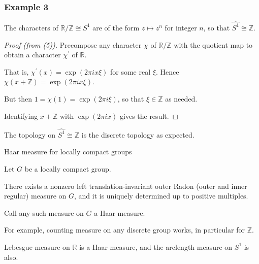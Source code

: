 \documentclass[mathserif
, handout
]{beamer}
\begin{document}
\begin{frame}
    \frametitle{Example 3}
The characters of $\mathbb{R}/\mathbb{Z}\cong S^1$ are of the form $z\mapsto z^n$ for integer $n$, so that $\widehat{S^1}\cong \mathbb{Z}$. \pause \begin{proof}[Proof (from (5))]
    Precompose any character $\chi$ of $\mathbb{R}/\mathbb{Z}$ with the quotient map to obtain a character $\chi^\prime$ of $\mathbb{R}$.\pause 

    That is, $\chi^\prime(x) = \exp(2\pi i x\xi)$ for some real $\xi$. Hence $\chi(x+\mathbb{Z}) = \exp(2\pi i x\xi)$.\pause 

    But then $1 = \chi(1) = \exp(2\pi i \xi)$, so that $\xi\in \mathbb{Z}$ as needed. \pause 

    Identifying $x+\mathbb{Z}$ with $\exp(2\pi i x)$ gives the result.
\end{proof} \pause
The topology on $\widehat{S^1}\cong\mathbb{Z}$ is the discrete topology as expected.
\end{frame}

\begin{frame}{Haar measure for locally compact groups}
    \begin{Theorem}[Haar]
        Let $G$ be a locally compact group. \pause 

        There exists a nonzero left translation-invariant outer Radon (outer and inner regular) measure on $G$, and it is uniquely determined up to positive multiples.

        Call any such measure on $G$ a Haar measure.
    \end{Theorem}
    \pause

    For example, counting measure on any discrete group works, in particular for $\mathbb{Z}$. 
    \pause 

    Lebesgue measure on $\mathbb{R}$ is a Haar measure, and the arclength measure on $S^1$ is also.
\end{frame}
\end{document}
